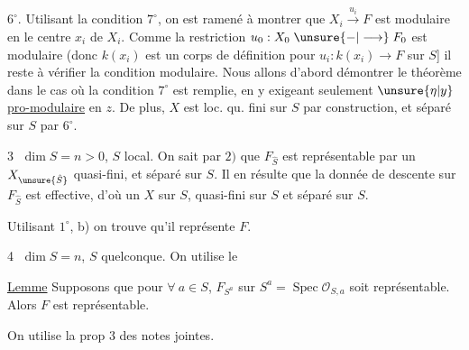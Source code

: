 \textcircled{$6^\circ$}. Utilisant la condition \textcircled{$7^\circ$}, on est ramené à montrer que $X_i\xrightarrow{u_i}F$ est modulaire en le centre $x_i$ de $X_i$. Comme la restriction $u_0:X_0\mathrel{\unsure{-|\longrightarrow}}F_0$ est modulaire (donc  $k(x_i)$ est un corps de définition pour $u_i:k(x_i)\longrightarrow F$ sur $S$] il reste à vérifier la condition modulaire. Nous allons  d'abord démontrer le théorème dans le cas où la condition $7^\circ$ est remplie, en y exigeant seulement $\unsure{\eta|y}$ \uline{pro-modulaire}  en $z$. De plus, $X$ est loc. qu. fini sur $S$ par construction, et séparé sur $S$ par $6^\circ$.

\textcircled{3} $\dim S=n>0$, $S$ local. On sait par $2)$ que $F_{\hat S}$ est représentable par un $X_{\unsure{\hat S}}$  quasi-fini, et séparé sur $S$. Il en résulte que la donnée de descente  sur $F_{\hat S}$ est effective,  d'où un $X$ sur $S$,  quasi-fini sur $S$ et séparé sur $S$.

Utilisant $1^\circ$, b) on trouve qu'il représente $F$.

\textcircled{4} $\dim S=n$, $S$ quelconque.  On utilise le

\uline{Lemme}  Supposons que pour $\forall\ a\in S$, $F_{S^a}$ sur $S^a=\operatorname{Spec}\mathcal O_{S,a}$ soit représentable. Alors $F$ est représentable.

On utilise la prop $3$ des notes jointes.
